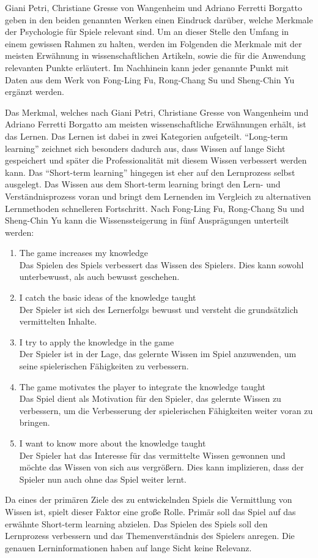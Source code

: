 	Giani Petri, Christiane Gresse von Wangenheim und Adriano Ferretti Borgatto geben in den beiden genannten Werken einen Eindruck darüber, welche Merkmale der Psychologie für Spiele relevant sind. Um an dieser Stelle den Umfang in einem gewissen Rahmen zu halten, werden im Folgenden die Merkmale mit der meisten Erwähnung in wissenschaftlichen Artikeln, sowie die für die Anwendung relevanten Punkte erläutert. Im Nachhinein kann jeder genannte Punkt mit Daten aus dem Werk von Fong-Ling Fu, Rong-Chang Su und Sheng-Chin Yu ergänzt werden.

	Das Merkmal, welches nach Giani Petri, Christiane Gresse von Wangenheim und Adriano Ferretti Borgatto am meisten wissenschaftliche Erwähnungen erhält, ist das Lernen. Das Lernen ist dabei in zwei Kategorien aufgeteilt. \enquote{Long-term learning} zeichnet sich besonders dadurch aus, dass Wissen auf lange Sicht gespeichert und später die Professionalität mit diesem Wissen verbessert werden kann. Das \enquote{Short-term learning} hingegen ist eher auf den Lernprozess selbst ausgelegt. Das Wissen aus dem Short-term learning bringt den Lern- und Verständnisprozess voran und bringt dem Lernenden im Vergleich zu alternativen Lernmethoden schnelleren Fortschritt. Nach Fong-Ling Fu, Rong-Chang Su und Sheng-Chin Yu kann die Wissenssteigerung in fünf Ausprägungen unterteilt werden:
	\begin{enumerate}
		\item{The game increases my knowledge} \hfill \\
		Das Spielen des Spiels verbessert das Wissen des Spielers. Dies kann sowohl unterbewusst, als auch bewusst geschehen.
		\item{I catch the basic ideas of the knowledge taught} \hfill \\
		Der Spieler ist sich des Lernerfolgs bewusst und versteht die grundsätzlich vermittelten Inhalte.
		\item{I try to apply the knowledge in the game}\hfill \\
		Der Spieler ist in der Lage, das gelernte Wissen im Spiel anzuwenden, um seine spielerischen Fähigkeiten zu verbessern.
		\item{The game motivates the player to integrate the knowledge taught}\hfill \\
		Das Spiel dient als Motivation für den Spieler, das gelernte Wissen zu verbessern, um die Verbesserung der spielerischen Fähigkeiten weiter voran zu bringen.
		\item{I want to know more about the knowledge taught}\hfill \\
		Der Spieler hat das Interesse für das vermittelte Wissen gewonnen und möchte das Wissen von sich aus vergrößern. Dies kann implizieren, dass der Spieler nun auch ohne das Spiel weiter lernt.
	\end{enumerate}
	Da eines der primären Ziele des zu entwickelnden Spiels die Vermittlung von Wissen ist, spielt dieser Faktor eine große Rolle. Primär soll das Spiel auf das erwähnte Short-term learning abzielen. Das Spielen des Spiels soll den Lernprozess verbessern und das Themenverständnis des Spielers anregen. Die genauen Lerninformationen haben auf lange Sicht keine Relevanz.

